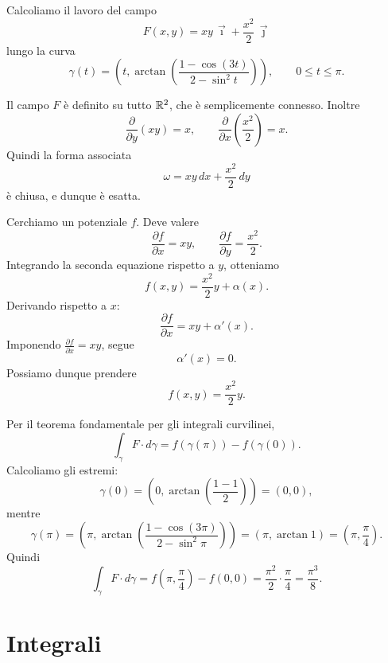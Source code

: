 \documentclass[a4paper]{article}
\begin{document}
\begin{snippetexample}{}
    Calcoliamo il lavoro del campo
    \[
        F(x,y)=xy\,\vec{\imath}+\frac{x^2}{2}\,\vec{\jmath}
    \]
    lungo la curva
    \[
        \gamma(t)=
        \left(
            t,
            \arctan\left(
                \frac{1-\cos(3t)}{2-\sin^2 t}
            \right)
        \right),
        \qquad 0\leq t\leq \pi.
    \]

    Il campo \(F\) è definito su tutto \(\mathbb{R}^2\), che è semplicemente connesso. Inoltre
    \[
        \frac{\partial}{\partial y}(xy)=x,
        \qquad
        \frac{\partial}{\partial x}\left(\frac{x^2}{2}\right)=x.
    \]
    Quindi la forma associata
    \[
        \omega=xy\,dx+\frac{x^2}{2}\,dy
    \]
    è chiusa, e dunque è esatta.

    Cerchiamo un potenziale \(f\). Deve valere
    \[
        \frac{\partial f}{\partial x}=xy,
        \qquad
        \frac{\partial f}{\partial y}=\frac{x^2}{2}.
    \]
    Integrando la seconda equazione rispetto a \(y\), otteniamo
    \[
        f(x,y)=\frac{x^2}{2}y+\alpha(x).
    \]
    Derivando rispetto a \(x\):
    \[
        \frac{\partial f}{\partial x}
        =
        xy+\alpha'(x).
    \]
    Imponendo \(\frac{\partial f}{\partial x}=xy\), segue
    \[
        \alpha'(x)=0.
    \]
    Possiamo dunque prendere
    \[
        f(x,y)=\frac{x^2}{2}y.
    \]

    Per il teorema fondamentale per gli integrali curvilinei,
    \[
        \int_\gamma F\cdot d\gamma
        =
        f(\gamma(\pi))-f(\gamma(0)).
    \]
    Calcoliamo gli estremi:
    \[
        \gamma(0)=
        \left(
            0,
            \arctan\left(\frac{1-1}{2}\right)
        \right)
        =
        (0,0),
    \]
    mentre
    \[
        \gamma(\pi)
        =
        \left(
            \pi,
            \arctan\left(\frac{1-\cos(3\pi)}{2-\sin^2\pi}\right)
        \right)
        =
        \left(\pi,\arctan 1\right)
        =
        \left(\pi,\frac{\pi}{4}\right).
    \]
    Quindi
    \[
        \int_\gamma F\cdot d\gamma
        =
        f\left(\pi,\frac{\pi}{4}\right)-f(0,0)
        =
        \frac{\pi^2}{2}\cdot\frac{\pi}{4}
        =
        \frac{\pi^3}{8}.
    \]
\end{snippetexample}

\pagebreak

\section{Integrali}
\end{document}
